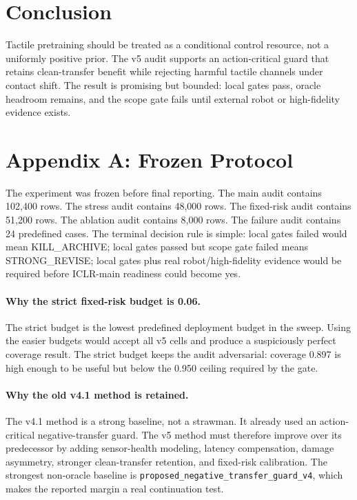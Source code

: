 \documentclass{article}
\begin{document}
\section{Conclusion}
Tactile pretraining should be treated as a conditional control resource, not a uniformly positive prior. The v5 audit supports an action-critical guard that retains clean-transfer benefit while rejecting harmful tactile channels under contact shift. The result is promising but bounded: local gates pass, oracle headroom remains, and the scope gate fails until external robot or high-fidelity evidence exists.

\clearpage
\appendix

\section{Appendix A: Frozen Protocol}
The experiment was frozen before final reporting. The main audit contains 102,400 rows. The stress audit contains 48,000 rows. The fixed-risk audit contains 51,200 rows. The ablation audit contains 8,000 rows. The failure audit contains 24 predefined cases. The terminal decision rule is simple: local gates failed would mean KILL\_ARCHIVE; local gates passed but scope gate failed means STRONG\_REVISE; local gates plus real robot/high-fidelity evidence would be required before ICLR-main readiness could become yes.

\paragraph{Why the strict fixed-risk budget is 0.06.}
The strict budget is the lowest predefined deployment budget in the sweep. Using the easier budgets would accept all v5 cells and produce a suspiciously perfect coverage result. The strict budget keeps the audit adversarial: coverage 0.897 is high enough to be useful but below the 0.950 ceiling required by the gate.

\paragraph{Why the old v4.1 method is retained.}
The v4.1 method is a strong baseline, not a strawman. It already used an action-critical negative-transfer guard. The v5 method must therefore improve over its predecessor by adding sensor-health modeling, latency compensation, damage asymmetry, stronger clean-transfer retention, and fixed-risk calibration. The strongest non-oracle baseline is \texttt{proposed\_negative\_transfer\_guard\_v4}, which makes the reported margin a real continuation test.
\end{document}
